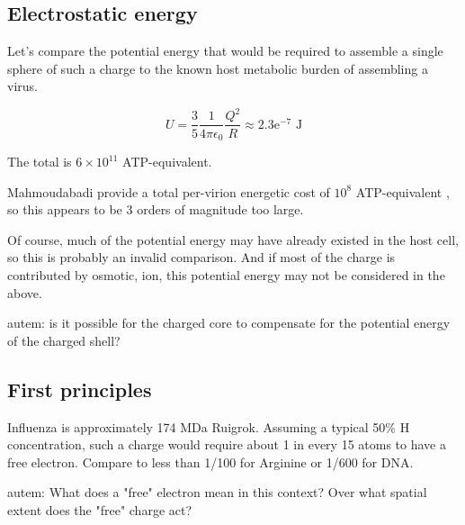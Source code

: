 \documentclass[paper.tex]{subfiles}
\begin{document}
\subsection{Electrostatic energy}

Let's compare the potential energy that would be required to assemble a single sphere of such a charge to the known host metabolic burden of assembling a virus.


$$ U = \frac{3}{5}  \frac{1}{4 \pi \epsilon_0} \frac{Q^2}{R} \approx 2.3\text{e}^{-7} \text{ J} $$

The total is $6 \times 10^{11}$ ATP-equivalent.


Mahmoudabadi\cite{Energetic2017} provide a total per-virion energetic cost of $10^8 $ ATP-equivalent , so this appears to be 3 orders of magnitude too large.

Of course, much of the potential energy may have already existed in the host cell, so this is probably an invalid comparison. And if most of the charge is contributed by osmotic, ion, this potential energy may not be considered in the above. 

\begin{autem}
	autem: is it possible for the charged core to compensate for the potential energy of the charged shell?
\end{autem}

\subsection{First principles}

Influenza is approximately 174 MDa Ruigrok. Assuming a typical 50\% H concentration, such a charge would require about 1 in every 15 atoms to have a free electron. Compare to less than 1/100 for Arginine or 1/600 for DNA.

\begin{autem}
	autem: What does a "free" electron mean in this context? Over what spatial extent does the "free" charge act?
\end{autem}
\end{document}
